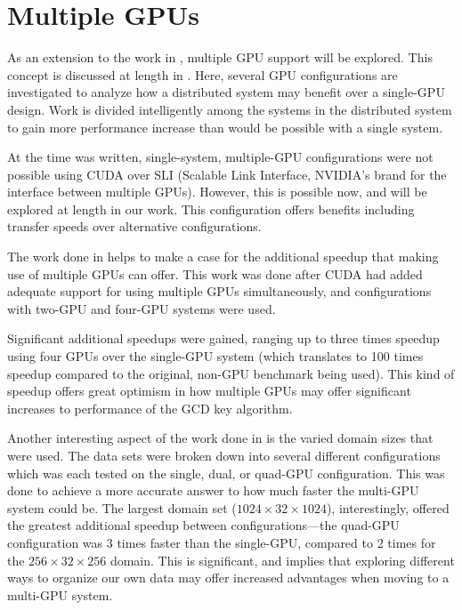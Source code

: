 \documentclass[12pt]{ucthesis}
\begin{document}
\section{Multiple GPUs}
\label{sec:multGPU}
As an extension to the work in \cite{scharfglass2012breaking}, multiple GPU support
will be explored. This concept is discussed at length in
\cite{schaa2009exploring}. Here, several GPU configurations are investigated to
analyze how a distributed system may benefit over a single-GPU design.
Work is divided intelligently among the systems in the distributed system to
gain more performance increase than would be possible with a single system.

At the time \cite{schaa2009exploring} was written, single-system,
multiple-GPU configurations were not possible using CUDA over SLI (Scalable
Link Interface, NVIDIA's brand for the interface between multiple GPUs).
However, this is possible now, and will be explored at length in our work.
This configuration offers benefits including transfer speeds over alternative
configurations.

The work done in \cite{thibault2009cuda} helps to make a case for the
additional speedup that making use of multiple GPUs can offer. This work was
done after CUDA had added adequate support for using multiple GPUs
simultaneously, and configurations with two-GPU and four-GPU systems were used.

Significant additional speedups were gained, ranging up to three times speedup
using four GPUs over the single-GPU system (which translates to 100 times
speedup compared to the original, non-GPU benchmark being used). This kind of
speedup offers great optimism in how multiple GPUs may offer significant
increases to performance of the GCD key algorithm.

Another interesting aspect of the work done in \cite{thibault2009cuda} is the
varied domain sizes that were used. The data sets were broken down into several
different configurations which was each tested on the single, dual, or quad-GPU
configuration. This was done to achieve a more accurate answer to how much
faster the multi-GPU system could be. The largest domain set
($1024\times32\times1024$), interestingly, offered the greatest additional
speedup between configurations---the quad-GPU configuration was 3 times faster
than the single-GPU, compared to 2 times for the $256\times32\times256$
domain. This is significant, and implies that exploring different ways to
organize our own data may offer increased advantages when moving to a multi-GPU
system.
\end{document}
